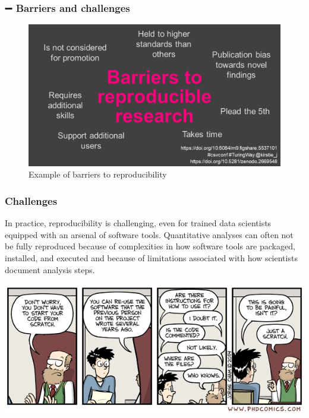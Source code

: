 \documentclass[
  letterpaper,
  DIV=11,
  numbers=noendperiod,
  oneside]{scrreprt}
\begin{document}
\hypertarget{barriers-and-challenges}{%
\subsubsection{\texorpdfstring{{➖} Barriers and
challenges}{➖ Barriers and challenges}}\label{barriers-and-challenges}}

\begin{figure}

{\centering \includegraphics{./images/paste-80DE769E.png}

}

\caption{\label{fig-barriers-reproducibility}Example of barriers to
reproducibility}

\end{figure}

\hypertarget{challenges}{%
\subsubsection{Challenges}\label{challenges}}

In practice, reproducibility is challenging, even for trained data
scientists equipped with an arsenal of software tools. Quantitative
analyses can often not be fully reproduced because of complexities in
how software tools are packaged, installed, and executed and because of
limitations associated with how scientists document analysis steps.

\includegraphics{./images/phd_comics_code_documentation.png}
\end{document}
